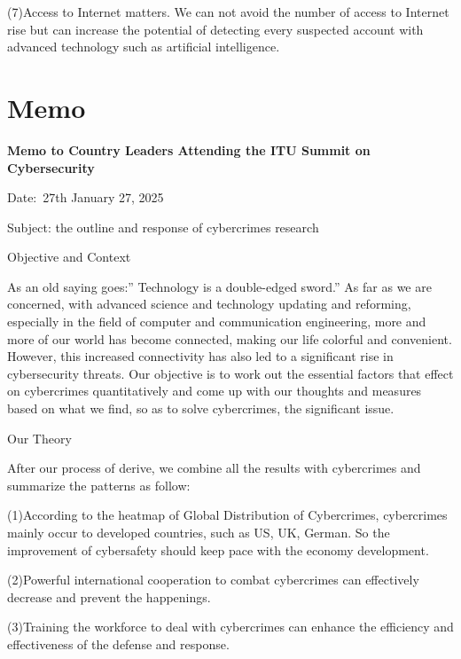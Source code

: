 \documentclass[12pt]{article}
\begin{document}
	(7)Access to Internet matters. We can not avoid the number of access to Internet rise but can increase the potential of detecting every suspected account with advanced technology such as artificial intelligence.\cite{AICyber}
	\section{Memo}
\textbf{Memo to Country Leaders Attending the ITU Summit on Cybersecurity}

	\begin{flushleft}
		Date: 27th January 27, 2025
	\end{flushleft}

\begin{flushleft}
		Subject: the outline and response of cybercrimes research
\end{flushleft}

	\begin{flushleft}
		Objective and Context
	\end{flushleft}

	As an old saying goes:” Technology is a double-edged sword.” As far as we are concerned, with advanced science and technology updating and reforming, especially in the field of computer and communication engineering, more and more of our world has become connected, making our life colorful and convenient. However, this increased connectivity has also led to a significant rise in cybersecurity threats. Our objective is to work out the essential factors that effect on cybercrimes quantitatively and come up with our thoughts and measures based on what we find, so as to solve cybercrimes, the significant issue.

	\begin{flushleft}
		Our Theory
	\end{flushleft}

	After our process of derive, we combine all the results with cybercrimes and summarize the patterns as follow:

	(1)According to the heatmap of Global Distribution of Cybercrimes, cybercrimes mainly occur to developed countries, such as US, UK, German. So the improvement of cybersafety should keep pace with the economy development.

	(2)Powerful international cooperation to combat cybercrimes can effectively decrease and prevent the happenings.

	(3)Training the workforce to deal with cybercrimes can enhance the efficiency and effectiveness of the defense and response.
\end{document}
